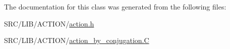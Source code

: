 The documentation for this class was generated from the following files\+:\begin{DoxyCompactItemize}
\item 
S\+R\+C/\+L\+I\+B/\+A\+C\+T\+I\+O\+N/\mbox{\hyperlink{action_8h}{action.\+h}}\item 
S\+R\+C/\+L\+I\+B/\+A\+C\+T\+I\+O\+N/\mbox{\hyperlink{action__by__conjugation_8_c}{action\+\_\+by\+\_\+conjugation.\+C}}\end{DoxyCompactItemize}
